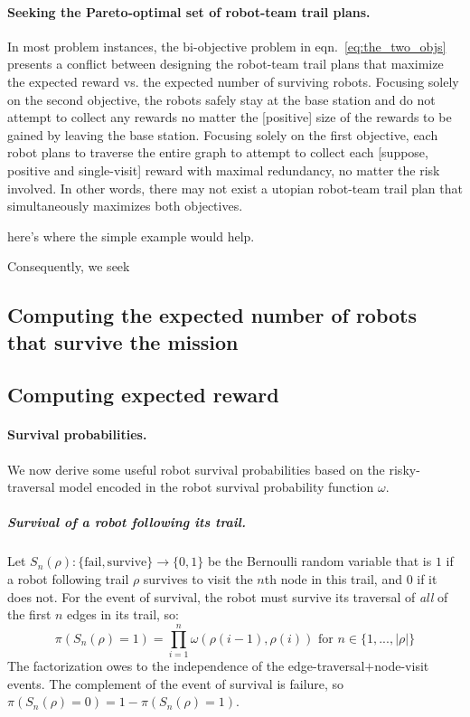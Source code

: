 \documentclass[11pt, oneside]{article}
\begin{document}
\paragraph{Seeking the Pareto-optimal set of robot-team trail plans.} 
In most problem instances, the bi-objective problem in eqn.~\ref{eq:the_two_objs} presents a conflict between designing the robot-team trail plans that maximize the expected reward vs. the expected number of surviving robots. 
Focusing solely on the second objective, the robots safely stay at the base station and do not attempt to collect any rewards no matter the [positive] size of the rewards to be gained by leaving the base station. 
Focusing solely on the first objective, each robot plans to traverse the entire graph to attempt to collect each [suppose, positive and single-visit] reward with maximal redundancy, no matter the risk involved.
In other words, there may not exist a utopian robot-team trail plan that simultaneously maximizes both objectives. 

{\color{red} here's where the simple example would help.}

Consequently, we seek

\subsection{Computing the expected number of robots that survive the mission}

\subsection{Computing expected reward}
\paragraph{Survival probabilities.} 
We now derive some useful robot survival probabilities based on the risky-traversal model encoded in the robot survival probability function $\omega$.

\subparagraph{Survival of a robot following its trail.}
Let $S_n(\rho) : \{\text{fail}, \text{survive}\} \rightarrow \{0, 1\} $ be the Bernoulli random variable that is $1$ if a robot following trail $\rho$ survives to visit the $n$th node in this trail, and $0$ if it does not. For the event of survival, the robot must survive its traversal of \emph{all} of the first $n$ edges in its trail, so:
\begin{equation}
	\pi(S_n(\rho) = 1) = \prod_{i=1}^n \omega(\rho(i-1), \rho(i)) \text{ for } n\in \{1, ..., \lvert \rho \rvert\} \label{eq:pi_S_n}
\end{equation} The factorization owes to the independence of the edge-traversal$+$node-visit events.
The complement of the event of survival is failure, so $\pi(S_n(\rho) = 0)=1-\pi(S_n(\rho) = 1)$.
\end{document}
